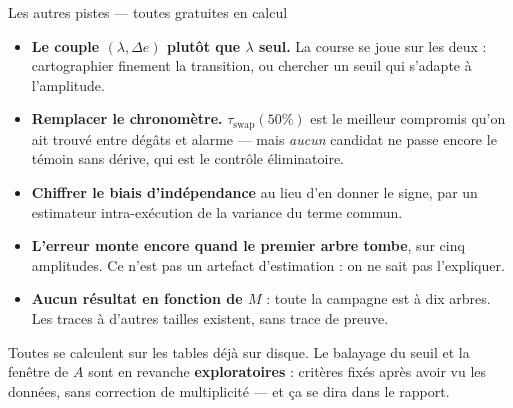 \documentclass[aspectratio=169,11pt]{beamer}
\begin{document}
\begin{frame}{Les autres pistes --- toutes gratuites en calcul}
  \small
  \begin{itemize}
    \item \textbf{Le couple $(\lambda, \Delta e)$ plutôt que $\lambda$ seul.}
      La course se joue sur les deux : cartographier finement la transition,
      ou chercher un seuil qui s'adapte à l'amplitude.
    \item \textbf{Remplacer le chronomètre.} $\tau_{\mathrm{swap}}(50\%)$ est le
      meilleur compromis qu'on ait trouvé entre dégâts et alarme --- mais
      \emph{aucun} candidat ne passe encore le témoin sans dérive, qui est le
      contrôle éliminatoire.
    \item \textbf{Chiffrer le biais d'indépendance} au lieu d'en donner le
      signe, par un estimateur intra-exécution de la variance du terme commun.
    \item \textbf{L'erreur monte encore quand le premier arbre tombe}, sur cinq
      amplitudes. Ce n'est pas un artefact d'estimation : on ne sait pas
      l'expliquer.
    \item \textbf{Aucun résultat en fonction de $M$} : toute la campagne est à
      dix arbres. Les traces à d'autres tailles existent, sans trace de preuve.
  \end{itemize}

  \vspace{0.2em}
  {\footnotesize\color{gray}Toutes se calculent sur les tables déjà sur disque.
  Le balayage du seuil et la fenêtre de $A$ sont en revanche
  \textbf{exploratoires} : critères fixés après avoir vu les données, sans
  correction de multiplicité --- et ça se dira dans le rapport.}
\end{frame}
\end{document}
